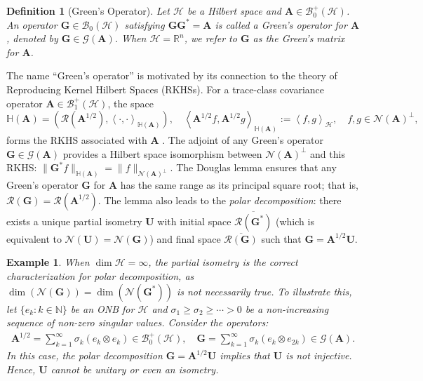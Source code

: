 \documentclass[noinfoline]{imsart}\setcounter{tocdepth}{2}
\renewcommand{\b}[1]{\mathbb{#1}} %
\newcommand{\m}[1]{\mathbf{#1}} %
\renewcommand{\c}[1]{\mathcal{#1}} %
\newcommand{\innpr}[2]{{\left\langle {#1},{#2}\right\rangle}} %
\theoremstyle{plain}
\newtheorem{definition}{Definition}[section]
\newtheorem{example}{Example}[section]
\begin{document}
\begin{definition}[Green's Operator]\label{def:Green's}
Let $\c{H}$ be a Hilbert space and $\m{A} \in \c{B}_{0}^{+}(\c{H})$. An operator $\m{G} \in \c{B}_{0}(\c{H})$ satisfying $\m{G} \m{G}^{*} = \m{A}$ is called a \emph{Green's operator} for $\m{A}$, denoted by $\m{G} \in \c{G}(\m{A})$. When $\c{H} = \b{R}^{n}$, we refer to $\m{G}$ as the \emph{Green's matrix} for $\m{A}$.
\end{definition}

The name ``Green's operator'' is motivated by its connection to the theory of Reproducing Kernel Hilbert Spaces (RKHSs). For a trace-class covariance operator $\m{A} \in \c{B}_{1}^{+}(\c{H})$, the space 
\begin{equation}\label{eq:Mahalanobis:RKHS}
    \b{H}(\m{A}) = (\c{R}(\m{A}^{1/2}), \innpr{\cdot}{\cdot}_{\b{H}(\m{A})}), \quad \innpr{\m{A}^{1/2} f}{\m{A}^{1/2} g}_{\b{H}(\m{A})} := \innpr{f}{g}_{\c{H}}, \quad f, g \in \c{N}(\m{A})^{\perp},
\end{equation}
forms the RKHS associated with $\m{A}$ \cite{paulsen2016introduction}. The adjoint of any Green's operator $\m{G} \in \c{G}(\m{A})$ provides a Hilbert space isomorphism between $\c{N}(\m{A})^{\perp}$ and this RKHS: $\| \m{G}^{*} f \|_{\b{H}(\m{A})} = \|f\|_{\c{N}(\m{A})^{\perp}}$. 
The Douglas lemma ensures that any Green's operator $\m{G}$ for $\m{A}$ has the same range as its principal square root; that is, $\c{R}(\m{G}) = \c{R}(\m{A}^{1/2})$. The lemma also leads to the \emph{polar decomposition}: there exists a unique partial isometry $\m{U}$ with initial space $\overline{\c{R}(\m{G}^{*})}$ (which is equivalent to $\c{N}(\m{U}) = \c{N}(\m{G})$) and final space $\overline{\c{R}(\m{G})}$ such that $\m{G} = \m{A}^{1/2} \m{U}$.

\begin{example}
When $\dim \c{H} = \infty$, the partial isometry is the correct characterization for polar decomposition, as $\dim (\c{N}(\m{G})) = \dim (\c{N}(\m{G}^{*}))$ is not necessarily true.
To illustrate this, let $\{e_{k} : k \in \b{N}\}$ be an ONB for $\c{H}$ and $\sigma_{1} \ge \sigma_{2} \ge \cdots > 0$ be a non-increasing sequence of non-zero singular values. Consider the operators:
\begin{align*}
    \m{A}^{1/2} = \sum_{k=1}^{\infty} \sigma_{k} (e_{k} \otimes e_{k}) \in \c{B}_{0}^{+}(\c{H}), \quad
    \m{G} = \sum_{k=1}^{\infty} \sigma_{k} (e_{k} \otimes e_{2k}) \in \c{G}(\m{A}).
\end{align*}
In this case, the polar decomposition $\m{G} = \m{A}^{1/2} \m{U}$ implies that $\m{U}$ is not injective. Hence, $\m{U}$ cannot be unitary or even an isometry.
\end{example}
\end{document}
